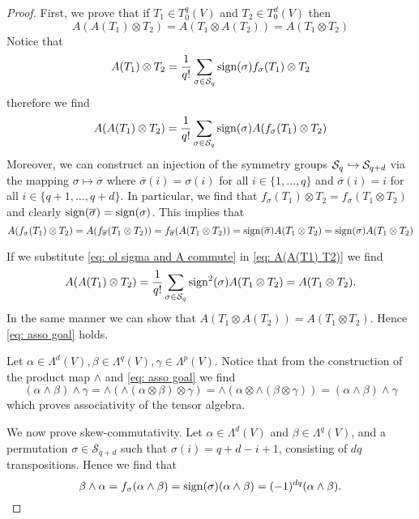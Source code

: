 \begin{proof}
  First, we prove that if \(T_1 \in T_0^q(V)\) and \(T_2 \in T_0^d(V)\) then
  \begin{equation}\label{eq: asso goal}
    A(A(T_1) \otimes T_2) = A(T_1 \otimes A(T_2)) =
    A(T_1 \otimes T_2)
  \end{equation} Notice that \[
    A(T_1) \otimes T_2 = \frac 1 {q!} \sum_{\sigma \in \mathcal S_q}
    \operatorname{sign}(\sigma) f_\sigma(T_1) \otimes T_2
  \]
  therefore we find
  \begin{equation}\label{eq: A(A(T1) T2)}
    A(A(T_1) \otimes T_2) = \frac 1 {q!} \sum_{\sigma \in \mathcal S_q}
    \operatorname{sign}(\sigma) A(f_\sigma(T_1) \otimes T_2)
  \end{equation}
  Moreover, we can construct an injection of the symmetry groups \(\mathcal S_q
  \hookrightarrow \mathcal S_{q + d}\) via the mapping \(\sigma \mapsto \overline \sigma\)
  where \(\overline \sigma(i) = \sigma(i)\) for all \(i \in \{1, \dots, q\}\)
  and \(\overline \sigma(i) = i\) for all \(i \in \{q + 1, \dots, q + d\}\). In
  particular, we find that \(f_\sigma(T_1) \otimes T_2 = f_{\overline \sigma}
  (T_1 \otimes T_2)\) and clearly \(\operatorname{sign}(\overline \sigma) = \operatorname{sign}(\sigma)\).
  This implies that
  \begin{equation}\label{eq: ol sigma and A commute}
    A(f_\sigma(T_1) \otimes T_2) = A(f_{\overline \sigma}(T_1 \otimes T_2))
    = f_{\overline \sigma}(A(T_1 \otimes T_2))
    = \operatorname{sign}(\overline \sigma) A(T_1 \otimes T_2)
    = \operatorname{sign}(\sigma) A(T_1 \otimes T_2)
  \end{equation}

  If we substitute \cref{eq: ol sigma and A commute} in \cref{eq: A(A(T1) T2)}
  we find
  \[
    A(A(T_1) \otimes T_2) = \frac 1 {q!} \sum_{\sigma \in \mathcal S_q}
    \operatorname{sign}^2(\sigma) A(T_1 \otimes T_2) = A(T_1 \otimes T_2).
  \]
  In the same manner we can show that \(A(T_1 \otimes A(T_2)) = A(T_1 \otimes
  T_2)\). Hence \cref{eq: asso goal} holds.

  Let \(\alpha \in \Lambda^d(V), \beta \in \Lambda^q(V), \gamma \in \Lambda^p(V)\).
  Notice that from the construction of the product map \(\wedge\) and \cref{eq:
  asso goal} we find
  \[
    (\alpha \wedge \beta) \wedge \gamma
    = \wedge\left( \wedge(\alpha \otimes \beta) \otimes \gamma \right)
    = \wedge\left(\alpha \otimes \wedge(\beta \otimes \gamma) \right)
    = (\alpha \wedge \beta) \wedge \gamma
  \]
  which proves associativity of the tensor algebra.

  We now prove skew-commutativity. Let \(\alpha \in \Lambda^d(V)\) and \(\beta
  \in \Lambda^q(V)\), and a permutation \(\sigma \in \mathcal S_{q + d}\) such
  that \(\sigma(i) = q + d - i + 1\), consisting of \(d q\) transpositions.
  Hence we find that
  \[
    \beta \wedge \alpha = f_\sigma(\alpha \wedge \beta)
    = \operatorname{sign}(\sigma)(\alpha \wedge \beta) = (-1)^{d q} (\alpha \wedge \beta).
  \]
\end{proof}

